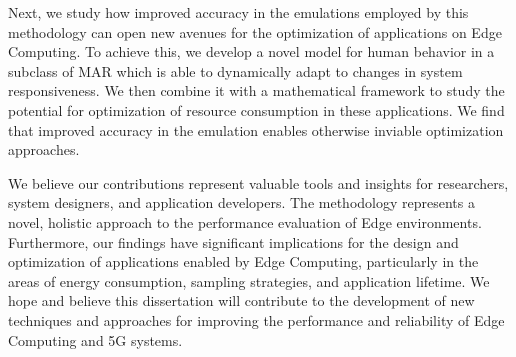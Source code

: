 Next, we study how improved accuracy in the emulations employed by this methodology can open new avenues for the optimization of applications on Edge Computing.
To achieve this, we develop a novel model for human behavior in a subclass of \gls{MAR} which is able to dynamically adapt to changes in system responsiveness.
We then combine it with a mathematical framework to study the potential for optimization of resource consumption in these applications.
We find that improved accuracy in the emulation enables otherwise inviable optimization approaches.

We believe our contributions represent valuable tools and insights for researchers, system designers, and application developers.
The methodology represents a novel, holistic approach to the performance evaluation of Edge environments.
Furthermore, our findings have significant implications for the design and optimization of applications enabled by Edge Computing, particularly in the areas of energy consumption, sampling strategies, and application lifetime.
We hope and believe this dissertation will contribute to the development of new techniques and approaches for improving the performance and reliability of Edge Computing and 5G systems.